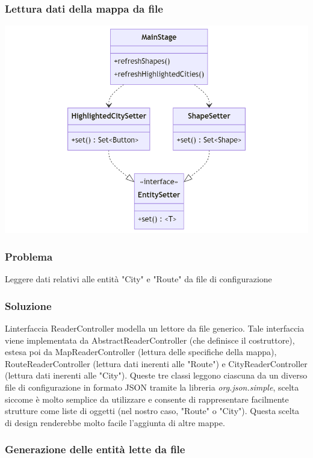 \documentclass[a4paper,12pt]{report}
\begin{document}
\subsubsection{Lettura dati della mappa da file}
\begin{center}
\includegraphics[scale=0.4]{mermaid-diagram-2024-02-22-222757.png}
\end{center}
\subsubsection{Problema}   Leggere dati relativi alle entità "City" e "Route" da file di configurazione

\subsubsection{Soluzione}  Linterfaccia ReaderController modella un lettore da file generico.
%
Tale interfaccia viene implementata da AbstractReaderController  (che definisce il costruttore), estesa poi da MapReaderController (lettura delle specifiche della mappa), RouteReaderController (lettura dati inerenti alle "Route") e CityReaderController (lettura dati inerenti alle "City"). 
%
Queste tre classi leggono ciascuna da un diverso file di configurazione in formato JSON tramite la libreria \textit{org.json.simple}, scelta siccome è molto semplice da utilizzare e consente di rappresentare facilmente strutture come liste di oggetti (nel nostro caso, "Route" o "City"). Questa scelta di design renderebbe molto facile l'aggiunta di altre mappe.
\newpage
%
\subsubsection{Generazione delle entità lette da file}
\end{document}
